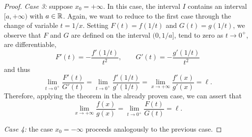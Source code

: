 \begin{proof}
\emph{Case 3:} suppose $x_0=+\infty$. In this case, the interval $I$ contains an interval $[a,+\infty)$ with $a\in{\mathbb R}$.
Again, we want to reduce to the first case through the change of variable
$t=1/x$. Setting $F(t) = f(1/t)$ and $G(t)= g(1/t)$, we observe that $F$ and $G$
are defined on the interval $(0,1/a]$, tend to zero as $t\to 0^+$, are
differentiable,
\[
  F'(t) = -\frac{f'(1/t)}{t^2}, \qquad
  G'(t) = -\frac{g'(1/t)}{t^2}
\]
and thus
\[
  \lim_{t\to 0^+} \frac{F'(t)}{G'(t)}
  = \lim_{t\to 0^+} \frac{f'(1/t)}{g'(1/t)}
  = \lim_{x\to +\infty} \frac{f'(x)}{g'(x)} = \ell.
\]
Therefore, applying the theorem in the already proven case, we can assert that
\[
  \lim_{x\to +\infty} \frac{f(x)}{g(x)} = \lim_{t\to 0^+} \frac{F(t)}{G(t)} = \ell.
\]

\emph{Case 4:} the case $x_0 = -\infty$ proceeds analogously to the previous case.
\end{proof}

